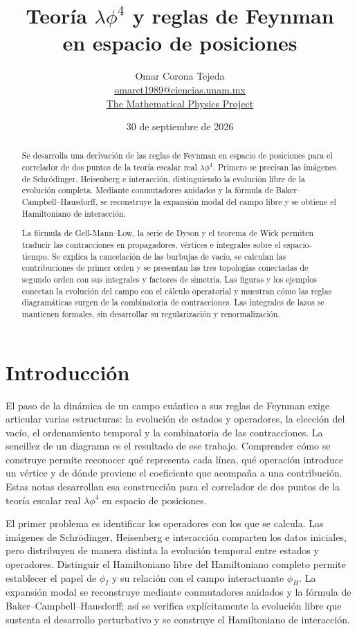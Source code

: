 \documentclass[11pt,letterpaper]{article}
\title{Teoría $\lambda\phi^4$ y reglas de Feynman\\
en espacio de posiciones}
\author{Omar Corona Tejeda\\
\href{mailto:omarct1989@ciencias.unam.mx}{omarct1989@ciencias.unam.mx}\\[0.2cm]
\href{https://artinnether.github.io/the_mathematical_physics_project/}
{The Mathematical Physics Project}}
\date{30 de septiembre de 2026}
\theoremstyle{definition}
\theoremstyle{definition}
\newcounter{diagrama}
\begin{document}
\maketitle

\begin{abstract}
Se desarrolla una derivación de las reglas de Feynman en espacio de
posiciones para el correlador de dos puntos de la teoría escalar real
$\lambda\phi^4$. Primero se precisan las imágenes de Schrödinger, Heisenberg
e interacción, distinguiendo la evolución libre de la evolución completa.
Mediante conmutadores anidados y la fórmula de Baker--Campbell--Hausdorff,
se reconstruye la expansión modal del campo libre y se obtiene el
Hamiltoniano de interacción.

La fórmula de Gell-Mann--Low, la serie de Dyson y el teorema de Wick
permiten traducir las contracciones en propagadores, vértices e integrales
sobre el espacio-tiempo. Se explica la cancelación de las burbujas de vacío,
se calculan las contribuciones de primer orden y se presentan las tres
topologías conectadas de segundo orden con sus integrales y factores de
simetría. Las figuras y los ejemplos conectan la evolución del campo con el cálculo
operatorial y muestran cómo las reglas diagramáticas surgen de la
combinatoria de contracciones. Las integrales de lazos se
mantienen formales, sin desarrollar su regularización y renormalización.
\end{abstract}

\section{Introducción}

El paso de la dinámica de un campo cuántico a sus reglas de Feynman exige
articular varias estructuras: la evolución de estados y operadores, la
elección del vacío, el ordenamiento temporal y la combinatoria de las
contracciones. La sencillez de un diagrama es el resultado de ese trabajo.
Comprender cómo se construye permite reconocer qué representa cada línea,
qué operación introduce un vértice y de dónde proviene el coeficiente que
acompaña a una contribución. Estas notas desarrollan esa construcción para
el correlador de dos puntos de la teoría escalar real $\lambda\phi^4$ en
espacio de posiciones.

El primer problema es identificar los operadores con los que se calcula.
Las imágenes de Schrödinger, Heisenberg e interacción comparten los datos
iniciales, pero distribuyen de manera distinta la evolución temporal entre
estados y operadores. Distinguir el Hamiltoniano libre del Hamiltoniano
completo permite establecer el papel de $\phi_I$ y su relación con el campo
interactuante $\phi_H$. La expansión modal se reconstruye mediante
conmutadores anidados y la fórmula de Baker--Campbell--Hausdorff; así se
verifica explícitamente la evolución libre que sustenta el desarrollo
perturbativo y se construye el Hamiltoniano de interacción.
\end{document}
